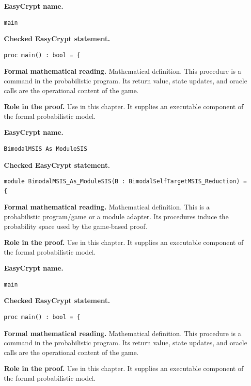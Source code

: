 \begin{formaldefinition}
\noindent\textbf{EasyCrypt name.}
\begin{lstlisting}[language=EasyCrypt,basicstyle=\ttfamily\scriptsize]
main
\end{lstlisting}
\noindent\textbf{Checked EasyCrypt statement.}
\begin{lstlisting}[language=EasyCrypt,basicstyle=\ttfamily\scriptsize]
proc main() : bool = {
\end{lstlisting}
\noindent\textbf{Formal mathematical reading.}
Mathematical definition. This procedure is a command in the probabilistic program.  Its return value, state updates, and oracle calls are the operational content of the game.

\noindent\textbf{Role in the proof.}
Use in this chapter. It supplies an executable component of the formal probabilistic model.

\end{formaldefinition}

\begin{formaldefinition}
\noindent\textbf{EasyCrypt name.}
\begin{lstlisting}[language=EasyCrypt,basicstyle=\ttfamily\scriptsize]
BimodalMSIS_As_ModuleSIS
\end{lstlisting}
\noindent\textbf{Checked EasyCrypt statement.}
\begin{lstlisting}[language=EasyCrypt,basicstyle=\ttfamily\scriptsize]
module BimodalMSIS_As_ModuleSIS(B : BimodalSelfTargetMSIS_Reduction) = {
\end{lstlisting}
\noindent\textbf{Formal mathematical reading.}
Mathematical definition. This is a probabilistic program/game or a module adapter.  Its procedures induce the probability space used by the game-based proof.

\noindent\textbf{Role in the proof.}
Use in this chapter. It supplies an executable component of the formal probabilistic model.

\end{formaldefinition}

\begin{formaldefinition}
\noindent\textbf{EasyCrypt name.}
\begin{lstlisting}[language=EasyCrypt,basicstyle=\ttfamily\scriptsize]
main
\end{lstlisting}
\noindent\textbf{Checked EasyCrypt statement.}
\begin{lstlisting}[language=EasyCrypt,basicstyle=\ttfamily\scriptsize]
proc main() : bool = {
\end{lstlisting}
\noindent\textbf{Formal mathematical reading.}
Mathematical definition. This procedure is a command in the probabilistic program.  Its return value, state updates, and oracle calls are the operational content of the game.

\noindent\textbf{Role in the proof.}
Use in this chapter. It supplies an executable component of the formal probabilistic model.

\end{formaldefinition}

